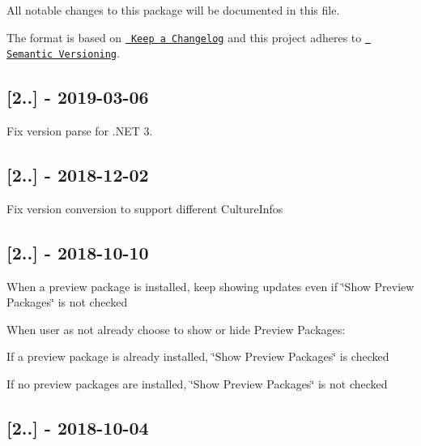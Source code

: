 All notable changes to this package will be documented in this file.

The format is based on \href{http://keepachangelog.com/en/1.0.0/}{\texttt{ Keep a Changelog}} and this project adheres to \href{http://semver.org/spec/v2.0.0.html}{\texttt{ Semantic Versioning}}.

\subsection*{\mbox{[}2..\mbox{]} -\/ 2019-\/03-\/06}


\begin{DoxyItemize}
\item Fix version parse for .N\+ET 3.
\end{DoxyItemize}

\subsection*{\mbox{[}2..\mbox{]} -\/ 2018-\/12-\/02}


\begin{DoxyItemize}
\item Fix version conversion to support different Culture\+Infos
\end{DoxyItemize}

\subsection*{\mbox{[}2..\mbox{]} -\/ 2018-\/10-\/10}


\begin{DoxyItemize}
\item When a preview package is installed, keep showing updates even if \char`\"{}\+Show Preview Packages\char`\"{} is not checked
\item When user as not already choose to show or hide Preview Packages\+:
\begin{DoxyItemize}
\item If a preview package is already installed, \char`\"{}\+Show Preview Packages\char`\"{} is checked
\item If no preview packages are installed, \char`\"{}\+Show Preview Packages\char`\"{} is not checked
\end{DoxyItemize}
\end{DoxyItemize}

\subsection*{\mbox{[}2..\mbox{]} -\/ 2018-\/10-\/04}


